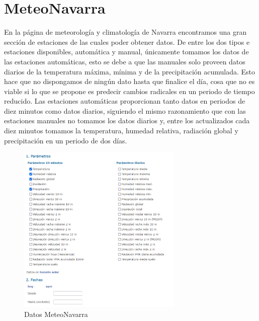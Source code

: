\section{MeteoNavarra}
En la página de meteorología y climatología de Navarra encontramos una gran sección de estaciones de las cuales poder obtener datos.
\newline
\newline
De entre los dos tipos e estaciones disponibles, automática y manual, únicamente tomamos los datos de las estaciones automáticas, esto se debe a que las manuales solo proveen datos diarios de la temperatura máxima, mínima y de la precipitación acumulada. Esto hace que no dispongamos de ningún dato hasta que finalice el día, cosa que no es viable si lo que se propone es predecir cambios radicales en un periodo de tiempo reducido.
\newline
\newline
Las estaciones automáticas proporcionan tanto datos en periodos de diez minutos como datos diarios, siguiendo el mismo razonamiento que con las estaciones manuales no tomamos los datos diarios y, entre los actualizados cada diez minutos tomamos la temperatura, humedad relativa, radiación global y precipitación en un periodo de dos días.

\begin{figure} [h!]
	\centering
	\includegraphics[width=0.7\textwidth]{fig/DatosMeteoNavarra.png}
	\caption[Apartado selección de datos MeteoNavarra]{Datos MeteoNavarra}
	\label{fig:ej6}
\end{figure}
